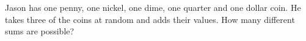 Jason has one penny, one nickel, one dime, one quarter and one dollar coin. He takes three of the coins at random and adds their values. How many different sums are possible?
